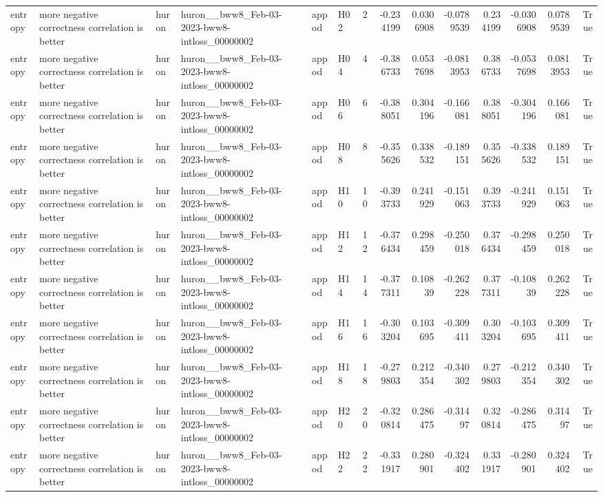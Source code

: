 \begin{longtable}{llllllrrrrrrrr}
entropy & more negative correctness correlation is better & huron & huron\_\_bww8\_Feb-03-2023-bww8-intloss\_00000002 & appod & H02 & 2 & -0.234199 & 0.0306908 & -0.0789539 & 0.234199 & -0.0306908 & 0.0789539 & True \\
entropy & more negative correctness correlation is better & huron & huron\_\_bww8\_Feb-03-2023-bww8-intloss\_00000002 & appod & H04 & 4 & -0.386733 & 0.0537698 & -0.0813953 & 0.386733 & -0.0537698 & 0.0813953 & True \\
entropy & more negative correctness correlation is better & huron & huron\_\_bww8\_Feb-03-2023-bww8-intloss\_00000002 & appod & H06 & 6 & -0.388051 & 0.304196 & -0.166081 & 0.388051 & -0.304196 & 0.166081 & True \\
entropy & more negative correctness correlation is better & huron & huron\_\_bww8\_Feb-03-2023-bww8-intloss\_00000002 & appod & H08 & 8 & -0.355626 & 0.338532 & -0.189151 & 0.355626 & -0.338532 & 0.189151 & True \\
entropy & more negative correctness correlation is better & huron & huron\_\_bww8\_Feb-03-2023-bww8-intloss\_00000002 & appod & H10 & 10 & -0.393733 & 0.241929 & -0.151063 & 0.393733 & -0.241929 & 0.151063 & True \\
entropy & more negative correctness correlation is better & huron & huron\_\_bww8\_Feb-03-2023-bww8-intloss\_00000002 & appod & H12 & 12 & -0.376434 & 0.298459 & -0.250018 & 0.376434 & -0.298459 & 0.250018 & True \\
entropy & more negative correctness correlation is better & huron & huron\_\_bww8\_Feb-03-2023-bww8-intloss\_00000002 & appod & H14 & 14 & -0.377311 & 0.10839 & -0.262228 & 0.377311 & -0.10839 & 0.262228 & True \\
entropy & more negative correctness correlation is better & huron & huron\_\_bww8\_Feb-03-2023-bww8-intloss\_00000002 & appod & H16 & 16 & -0.303204 & 0.103695 & -0.309411 & 0.303204 & -0.103695 & 0.309411 & True \\
entropy & more negative correctness correlation is better & huron & huron\_\_bww8\_Feb-03-2023-bww8-intloss\_00000002 & appod & H18 & 18 & -0.279803 & 0.212354 & -0.340302 & 0.279803 & -0.212354 & 0.340302 & True \\
entropy & more negative correctness correlation is better & huron & huron\_\_bww8\_Feb-03-2023-bww8-intloss\_00000002 & appod & H20 & 20 & -0.320814 & 0.286475 & -0.31497 & 0.320814 & -0.286475 & 0.31497 & True \\
entropy & more negative correctness correlation is better & huron & huron\_\_bww8\_Feb-03-2023-bww8-intloss\_00000002 & appod & H22 & 22 & -0.331917 & 0.280901 & -0.324402 & 0.331917 & -0.280901 & 0.324402 & True \\

\end{longtable}
